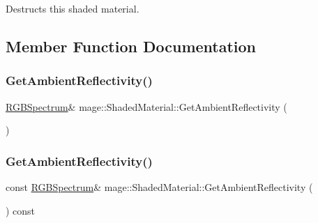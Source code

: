 Destructs this shaded material. 

\subsection{Member Function Documentation}
\hypertarget{structmage_1_1_shaded_material_afb2818be33977199ecb93689a76e5622}{}\label{structmage_1_1_shaded_material_afb2818be33977199ecb93689a76e5622} 
\subsubsection{\texorpdfstring{Get\+Ambient\+Reflectivity()}{GetAmbientReflectivity()}\hspace{0.1cm}{\footnotesize\ttfamily [1/2]}}
{\footnotesize\ttfamily \hyperlink{structmage_1_1_r_g_b_spectrum}{R\+G\+B\+Spectrum}\& mage\+::\+Shaded\+Material\+::\+Get\+Ambient\+Reflectivity (\begin{DoxyParamCaption}{ }\end{DoxyParamCaption})\hspace{0.3cm}{\ttfamily [noexcept]}}

\hypertarget{structmage_1_1_shaded_material_a4bb3403853e4d6ee9e443e575b33a755}{}\label{structmage_1_1_shaded_material_a4bb3403853e4d6ee9e443e575b33a755} 
\subsubsection{\texorpdfstring{Get\+Ambient\+Reflectivity()}{GetAmbientReflectivity()}\hspace{0.1cm}{\footnotesize\ttfamily [2/2]}}
{\footnotesize\ttfamily const \hyperlink{structmage_1_1_r_g_b_spectrum}{R\+G\+B\+Spectrum}\& mage\+::\+Shaded\+Material\+::\+Get\+Ambient\+Reflectivity (\begin{DoxyParamCaption}{ }\end{DoxyParamCaption}) const\hspace{0.3cm}{\ttfamily [noexcept]}}

\hypertarget{structmage_1_1_shaded_material_ae5e18984deccbd70ec76709e417b949f}{}\label{structmage_1_1_shaded_material_ae5e18984deccbd70ec76709e417b949f} 
